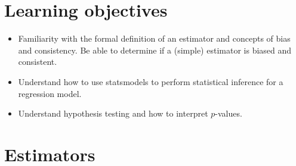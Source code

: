 \section{Learning objectives}

\begin{itemize}
\item Familiarity with the formal definition of an estimator and concepts of bias and consistency. Be able to determine if a (simple) estimator is biased and consistent. 
\item Understand how to use statsmodels to perform statistical inference for a regression model. 
\item Understand hypothesis testing and how to interpret $p$-values. 
\end{itemize}

\section{Estimators}
